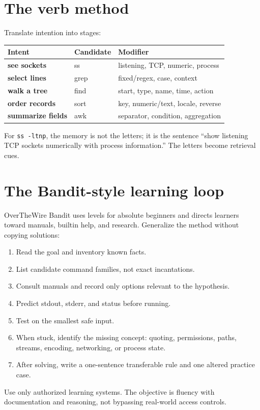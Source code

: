 \documentclass[11pt,oneside,openany]{book}
\begin{document}
\section{The verb method}
Translate intention into stages:
\begin{center}
\begin{tabularx}{0.9\textwidth}{>{\bfseries}p{}>{\ttfamily}p{}X}
\toprule
Intent & Candidate & Modifier \\
\midrule
see sockets & ss & listening, TCP, numeric, process \\
select lines & grep & fixed/regex, case, context \\
walk a tree & find & start, type, name, time, action \\
order records & sort & key, numeric/text, locale, reverse \\
summarize fields & awk & separator, condition, aggregation \\
\bottomrule
\end{tabularx}
\end{center}
For \texttt{ss -ltnp}, the memory is not the letters; it is the sentence “show listening TCP sockets numerically with process information.” The letters become retrieval cues.

\section{The Bandit-style learning loop}
OverTheWire Bandit uses levels for absolute beginners and directs learners toward manuals, builtin help, and research. Generalize the method without copying solutions:
\begin{enumerate}
  \item Read the goal and inventory known facts.
  \item List candidate command families, not exact incantations.
  \item Consult manuals and record only options relevant to the hypothesis.
  \item Predict stdout, stderr, and status before running.
  \item Test on the smallest safe input.
  \item When stuck, identify the missing concept: quoting, permissions, paths, streams, encoding, networking, or process state.
  \item After solving, write a one-sentence transferable rule and one altered practice case.
\end{enumerate}
Use only authorized learning systems. The objective is fluency with documentation and reasoning, not bypassing real-world access controls.
\end{document}
